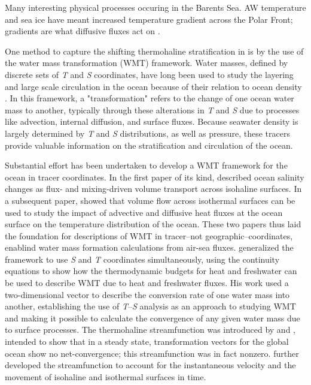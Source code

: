 \documentclass[draft]{agujournal2019}
\begin{document}
 Many interesting physical processes occuring in the Barents Sea. AW temperature and sea ice have meant increased temperature gradient across the Polar Front; gradients are what diffusive fluxes act on \cite{Barton18}.


One method to capture the shifting thermohaline stratification in is by the use of the water mass transformation (WMT) framework. Water masses, defined by discrete sets of \emph{T} and  \emph{S} coordinates, have long been used to study the layering and large scale circulation in the ocean because of their relation to ocean density \cite{sverdrup1942}. In this framework, a "transformation" refers to the change of one ocean water mass to another, typically through these alterations in \emph{T} and \emph{S} due to processes like advection, internal diffusion, and surface fluxes. Because seawater density is largely determined by \emph{T} and \emph{S} distributions, as well as pressure, these tracers provide valuable information on the stratification and circulation of the ocean.

Substantial effort has been undertaken to develop a WMT framework for the ocean in tracer coordinates. In the first paper of its kind,  described ocean salinity changes as flux- and mixing-driven volume transport across isohaline surfaces. In a subsequent paper,  showed that volume flow across isothermal surfaces can be used to study the impact of advective and diffusive heat fluxes at the ocean surface on the temperature distribution of the ocean. These two papers thus laid the foundation for descriptions of WMT in tracer--not geographic--coordinates, enablind water mass formation calculations from air-sea fluxes.  generalized the  framework to use \emph{S} and \emph{T} coordinates simultaneously, using the continuity equations to show how the thermodynamic budgets for heat and freshwater can be used to describe WMT due to heat and freshwater fluxes. His work used a two-dimensional vector to describe the conversion rate of one water mass into another, establishing the use of \emph{T}--\emph{S} analysis as an approach to studying WMT and making it possible to calculate the convergence of any given water mass due to surface processes. The thermohaline streamfunction was introduced by  and , intended to show that in a steady state, transformation vectors for the global ocean show no net-convergence; this streamfunction was in fact nonzero.  further developed the streamfunction to account for the instantaneous velocity and the movement of isohaline and isothermal surfaces in time.
\end{document}
